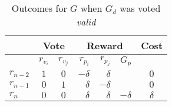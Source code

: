 \begin{table}[hbt]
    \caption{Outcomes for $G$ when $G_d$ was voted \emph{valid}}
    \begin{tabular}{lccrrrc}
    \toprule
        \hspace   & \multicolumn{2}{c}{Vote} & \multicolumn{3}{c}{Reward} & Cost                     \\
    \midrule
        \hspace   & $r_{v_i}$  & $r_{v_j}$   & $r_{p_i}$ & $r_{p_j}$ & $G_p$     &                   \\
    \addlinespace[0.5em]
        $r_{n-2}$ & $1$        & $0$         & $-\delta$ & $\delta$  &           & $0$               \\
        $r_{n-1}$ & $0$        & $1$         & $\delta$  & $-\delta$ &           & $0$               \\
        $r_{n}$   & $0$        & $0$         & $\delta$  & $\delta$  & $-\delta$ & $\delta$          \\
    \bottomrule
    \end{tabular}
\end{table}

